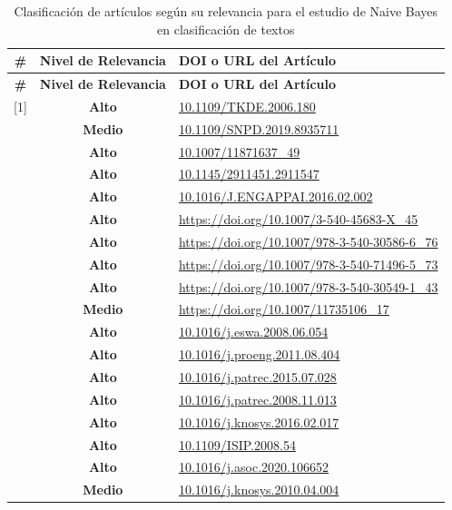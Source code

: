 \documentclass[11pt,a4paper]{article}
\begin{document}
\begin{longtable}{|c|c|p{9cm}|}
\caption{Clasificación de artículos según su relevancia para el estudio de Naive Bayes en clasificación de textos}
\label{tab:clasificacion-articulos} \\
\hline
\textbf{\#} & \textbf{Nivel de Relevancia} & \textbf{DOI o URL del Artículo} \\
\hline
\endfirsthead

\hline
\textbf{\#} & \textbf{Nivel de Relevancia} & \textbf{DOI o URL del Artículo} \\
\hline
\endhead

[1]  & \textbf{Alto}  & \url{10.1109/TKDE.2006.180} \\
\hline
[2]  & \textbf{Medio} & \url{10.1109/SNPD.2019.8935711} \\
\hline
[3]  & \textbf{Alto}  & \url{10.1007/11871637_49} \\
\hline
[4]  & \textbf{Alto}  & \url{10.1145/2911451.2911547} \\
\hline
[5]  & \textbf{Alto}  & \url{10.1016/J.ENGAPPAI.2016.02.002} \\
\hline
[6]  & \textbf{Alto}  & \url{https://doi.org/10.1007/3-540-45683-X_45} \\
\hline
[7]  & \textbf{Alto}  & \url{https://doi.org/10.1007/978-3-540-30586-6_76} \\
\hline
[8]  & \textbf{Alto}  & \url{https://doi.org/10.1007/978-3-540-71496-5_73} \\
\hline
[9]  & \textbf{Alto}  & \url{https://doi.org/10.1007/978-3-540-30549-1_43} \\
\hline
[10] & \textbf{Medio} & \url{https://doi.org/10.1007/11735106_17} \\
\hline
[11] & \textbf{Alto}  & \url{10.1016/j.eswa.2008.06.054} \\
\hline
[12] & \textbf{Alto}  & \url{10.1016/j.proeng.2011.08.404} \\
\hline
[13] & \textbf{Alto}  & \url{10.1016/j.patrec.2015.07.028} \\
\hline
[14] & \textbf{Alto}  & \url{10.1016/j.patrec.2008.11.013} \\
\hline
[15] & \textbf{Alto}  & \url{10.1016/j.knosys.2016.02.017} \\
\hline
[16] & \textbf{Alto}  & \url{10.1109/ISIP.2008.54} \\
\hline
[17] & \textbf{Alto}  & \url{10.1016/j.asoc.2020.106652} \\
\hline
[18] & \textbf{Medio} & \url{10.1016/j.knosys.2010.04.004} \\

\end{longtable}
\end{document}
